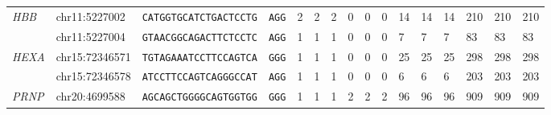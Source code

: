 \documentclass[pdftex,english,10pt]{article}
\begin{document}
\begin{table}[h]
{\begin{tabular}{|l|lll|llllllllllll|}
\multirow{2}{*}{\textit{HBB}}                       & chr11:5227002                                         & \texttt{CATGGTGCATCTGACTCCTG}                        & \texttt{AGG}              & 2                     &       2                   & \multicolumn{1}{l|}{2}    & 0                     & 0                          & \multicolumn{1}{l|}{0}    & 14                    & 14                         & \multicolumn{1}{l|}{14}    & 210                   &       210                      &      210                     \\
                                           & chr11:5227004                                         & \texttt{GTAACGGCAGACTTCTCCTC}                        & \texttt{AGG}                                       & 1                     &       1                     & \multicolumn{1}{l|}{1}    & 0                     & 0                          & \multicolumn{1}{l|}{0}    & 7                     &    7                        & \multicolumn{1}{l|}{7}    & 83                    &          83                   &     83                     \\ \hline
\multirow{2}{*}{\textit{HEXA}}                      & chr15:72346571                                         & \texttt{TGTAGAAATCCTTCCAGTCA}                        & \texttt{GGG}            & 1                     &           1                 & \multicolumn{1}{l|}{1}    & 0                     &    0                        & \multicolumn{1}{l|}{0}    & 25                    &    25                        & \multicolumn{1}{l|}{25}    & 298                   & 298                          &      298                      \\
                                           & chr15:72346578                                         & \texttt{ATCCTTCCAGTCAGGGCCAT}                        & \texttt{AGG}                                       & 1                     &         1                   & \multicolumn{1}{l|}{1}    & 0                     &        0                    & \multicolumn{1}{l|}{0}   & 6                     &       6                     & \multicolumn{1}{l|}{6}    & 203                   &     203                       &          203                  \\ \hline
\multirow{4}{*}{\textit{PRNP}}                      & chr20:4699588                                         & \texttt{AGCAGCTGGGGCAGTGGTGG}                        & \texttt{GGG}            & 1                     &   1                         & \multicolumn{1}{l|}{1}    & 2                     &        2                    & \multicolumn{1}{l|}{2}    & 96                    &     96                       & \multicolumn{1}{l|}{96}    & 909                   &     909                       &    909                       \\

\end{tabular}}
\end{table}
\end{document}
